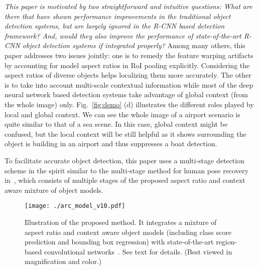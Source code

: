 \documentclass[10pt,twocolumn,letterpaper]{article}
\begin{document}
\textit{This paper is motivated by two straightforward and intuitive questions: What are there that have shown performance improvements in the traditional object detection systems, but are largely ignored in the R-CNN based detection framework? And, would they also improve the performance of state-of-the-art R-CNN object detection systems if integrated properly?} 
Among many others, this paper addresses two issues jointly: one is to remedy the feature warping artifacts by accounting for model aspect ratios in RoI pooling explicitly. Considering the aspect ratios of diverse objects helps localizing them more accurately. 
The other is to take into account multi-scale contextual information while most of the deep neural network based detection systems take advantage of global context (from the whole image) only. Fig.~\ref{fig:demo} (d) illustrates the different roles played by local and global context. We can see the whole image of a airport scenario is quite similar to that of a sea scene. In this case, global context might be confused, but the local context will be still helpful as it shows surrounding the object is building in an airport and thus suppresses a boat detection.

To facilitate accurate object detection, this paper uses a multi-stage detection scheme in the spirit similar to the multi-stage method for human pose recovery in~\cite{cao2016realtime}, which consists of multiple stages of the proposed aspect ratio and context aware mixture of object models.  

\iffalse{
The experimental results show the integration of aspect ratio and context can benefit the widely used R-CNN based object detection systems significantly. 
}\fi

\begin{figure} %
\centering
{\texttt{[image: ./arc\_model\_v10.pdf]}}
\caption{Illustration of the proposed method. It integrates a mixture of aspect ratio and context aware object models (including class score prediction and bounding box regression) with state-of-the-art region-based convolutional networks~\cite{faster_rcnn,rfcn}. See text for details. (Best viewed in magnification and color.) %
}
\vspace{-3mm} 
\label{fig:model}
\end{figure} 
\end{document}
